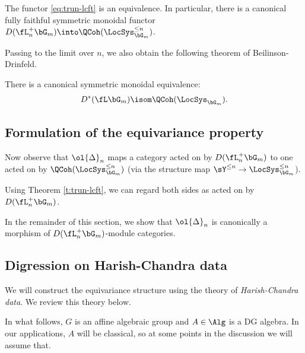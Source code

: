 \begin{thm}
\notready\label{t:trun-lcft}

The functor \eqref{eq:trun-lcft} is an equivalence.
In particular, there is a canonical fully faithful symmetric monoidal functor
$D(\fL_n^+\bG_m) \into \QCoh(\LocSys_{\bG_m}^{\leq n})$.

\end{thm}

Passing to the limit over $n$, we also obtain the following theorem
of Beilinson-Drinfeld.

\begin{thm}
\notready\label{t:full-lcft}

There is a canonical symmetric monoidal equivalence:
%
\[
D^*(\fL\bG_m) \isom \QCoh(\LocSys_{\bG_m}).
\]

\end{thm}

\subsection{Formulation of the equivariance property}

Now observe that $\ol{\Delta}_n$ maps a category acted on by
$D(\fL_n^+\bG_m)$ to one acted on by
$\QCoh(\LocSys_{\bG_m}^{\leq n})$ (via the structure map
$\sY^{\leq n} \to \LocSys_{\bG_m}^{\leq n}$).

Using Theorem \ref{t:trun-lcft}, we can regard both sides as
acted on by $D(\fL_n^+\bG_m)$.

In the remainder of this section, we show that
$\ol{\Delta}_n$ is canonically a morphism of
$D(\fL_n^+\bG_m)$-module categories.

\subsection{Digression on Harish-Chandra data}\label{ss:hc}

We will construct the equivariance structure using the theory of \emph{Harish-Chandra
data}. We review this theory below.

In what follows, $G$ is an affine algebraic group and $A \in \Alg$ is a DG algebra.
In our applications, $A$ will be classical, so at some points in the discussion we
will assume that.

\subsubsection{}

